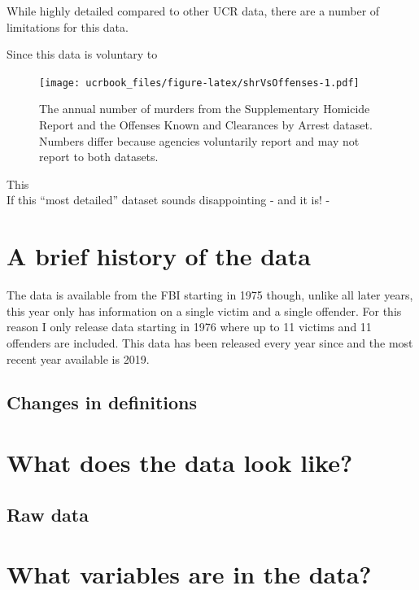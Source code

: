 \documentclass[
  12pt,
  openany]{book}
\begin{document}
While highly detailed compared to other UCR data, there are a number of limitations for this data.

Since this data is voluntary to

\begin{figure}
\centering
\texttt{[image: ucrbook\_files/figure-latex/shrVsOffenses-1.pdf]}
\caption{\label{fig:shrVsOffenses}The annual number of murders from the Supplementary Homicide Report and the Offenses Known and Clearances by Arrest dataset. Numbers differ because agencies voluntarily report and may not report to both datasets.}
\end{figure}

This\\
If this ``most detailed'' dataset sounds disappointing - and it is! -

\hypertarget{a-brief-history-of-the-data-2}{%
\section{A brief history of the data}\label{a-brief-history-of-the-data-2}}

The data is available from the FBI starting in 1975 though, unlike all later years, this year only has information on a single victim and a single offender. For this reason I only release data starting in 1976 where up to 11 victims and 11 offenders are included. This data has been released every year since and the most recent year available is 2019.

\hypertarget{changes-in-definitions-2}{%
\subsection{Changes in definitions}\label{changes-in-definitions-2}}

\hypertarget{what-does-the-data-look-like-2}{%
\section{What does the data look like?}\label{what-does-the-data-look-like-2}}

\hypertarget{raw-data-1}{%
\subsection{Raw data}\label{raw-data-1}}

\hypertarget{what-variables-are-in-the-data-2}{%
\section{What variables are in the data?}\label{what-variables-are-in-the-data-2}}
\end{document}

